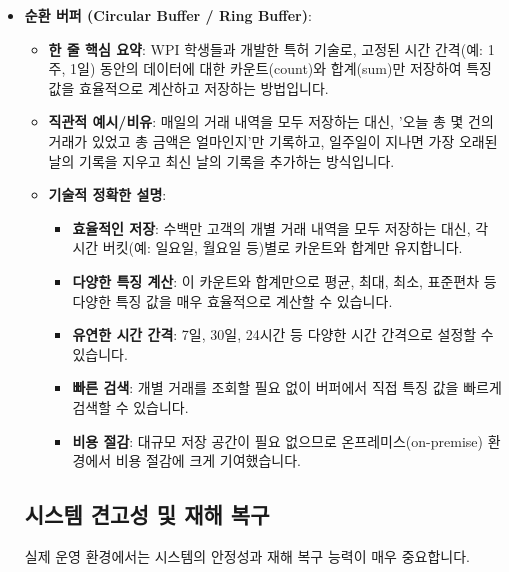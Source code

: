 \documentclass[11pt,a4paper]{article}
\begin{document}
\begin{itemize}
\begin{itemize}
\begin{itemize}
\begin{itemize}
\begin{itemize}
    \item \textbf{순환 버퍼 (Circular Buffer / Ring Buffer)}:
    \begin{itemize}
        \item \textbf{한 줄 핵심 요약}: WPI 학생들과 개발한 특허 기술로, 고정된 시간 간격(예: 1주, 1일) 동안의 데이터에 대한 카운트(count)와 합계(sum)만 저장하여 특징 값을 효율적으로 계산하고 저장하는 방법입니다.
        \item \textbf{직관적 예시/비유}: 매일의 거래 내역을 모두 저장하는 대신, '오늘 총 몇 건의 거래가 있었고 총 금액은 얼마인지'만 기록하고, 일주일이 지나면 가장 오래된 날의 기록을 지우고 최신 날의 기록을 추가하는 방식입니다.
        \item \textbf{기술적 정확한 설명}:
        \begin{itemize}
            \item \textbf{효율적인 저장}: 수백만 고객의 개별 거래 내역을 모두 저장하는 대신, 각 시간 버킷(예: 일요일, 월요일 등)별로 카운트와 합계만 유지합니다.
            \item \textbf{다양한 특징 계산}: 이 카운트와 합계만으로 평균, 최대, 최소, 표준편차 등 다양한 특징 값을 매우 효율적으로 계산할 수 있습니다.
            \item \textbf{유연한 시간 간격}: 7일, 30일, 24시간 등 다양한 시간 간격으로 설정할 수 있습니다.
            \item \textbf{빠른 검색}: 개별 거래를 조회할 필요 없이 버퍼에서 직접 특징 값을 빠르게 검색할 수 있습니다.
            \item \textbf{비용 절감}: 대규모 저장 공간이 필요 없으므로 온프레미스(on-premise) 환경에서 비용 절감에 크게 기여했습니다.
        \end{itemize}
    \end{itemize}

\subsection*{시스템 견고성 및 재해 복구}

실제 운영 환경에서는 시스템의 안정성과 재해 복구 능력이 매우 중요합니다.


\end{itemize}
\end{itemize}
\end{itemize}
\end{itemize}
\end{itemize}
\end{document}
